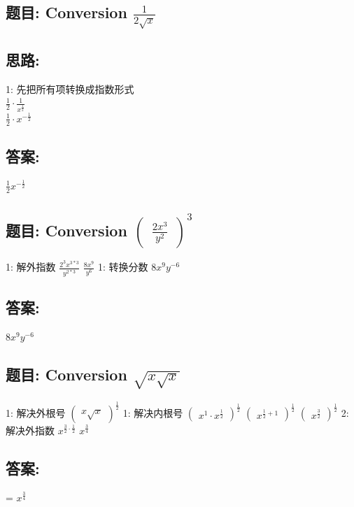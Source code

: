 \documentclass[12pt]{article}
\begin{document}
\subsection*{题目: Conversion  $\frac{1}{2\sqrt{x}}$}
\subsection*{思路:}
1: 先把所有项转换成指数形式 \\
$\frac{1}{2} \cdot \frac{1}{x^{\frac{1}{2}}}$ \\
$\frac{1}{2} \cdot x^{-\frac{1}{2}}$ \\

\subsection*{答案:}
$\frac{1}{2}x^{-\frac{1}{2}}$

\subsection*{题目: Conversion  $\begin{pmatrix}\frac{2x^{3}}{y^{2}}\end{pmatrix}^{3}$}
1: 解外指数
$\frac{2^{3}x^{3*3}}{y^{2*3}}$
$\frac{8x^{9}}{y^{6}}$
1: 转换分数
$8x^{9}y^{-6}$
\subsection*{答案:}
$8x^{9}y^{-6}$

\subsection*{题目: Conversion  $\sqrt{x\sqrt{x}}$}
1: 解决外根号
 $\begin{pmatrix}
 x\sqrt{x}
\end{pmatrix}^{\frac{1}{2}}$
1: 解决内根号
 $\begin{pmatrix}
 x^{1} \cdot x^{\frac{1}{2}}
\end{pmatrix}^{\frac{1}{2}}$
 $\begin{pmatrix}
 x^{\frac{1}{2} + 1}
\end{pmatrix}^{\frac{1}{2}}$
 $\begin{pmatrix}
 x^{\frac{3}{2}}
\end{pmatrix}^{\frac{1}{2}}$
2: 解决外指数
 $x^{\frac{3}{2} \cdot \frac{1}{2}}$
 $x^{\frac{3}{4}}$

\subsection*{答案:}
= $x^{\frac{3}{4}}$
\end{document}
